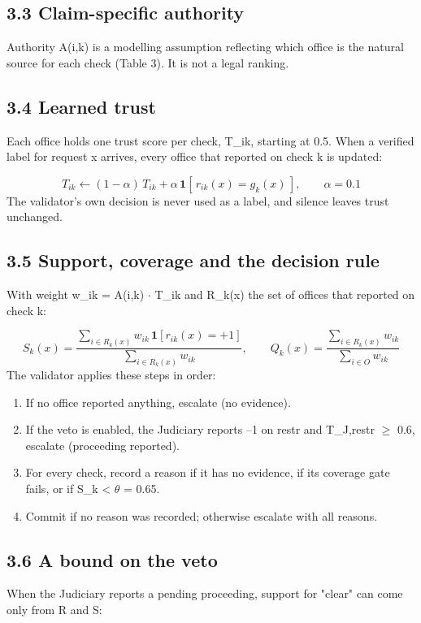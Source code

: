\documentclass[10pt]{article}
\begin{document}

\subsection*{3.3 Claim-specific authority}
Authority A(i,k) is a modelling assumption reflecting which office is the natural source for each check (Table 3). It is not a legal ranking.


\subsection*{3.4 Learned trust}
Each office holds one trust score per check, T\_ik, starting at 0.5. When a verified label for request x arrives, every office that reported on check k is updated:

\[ T_{ik} \leftarrow (1-\alpha)\,T_{ik} + \alpha\,\mathbf{1}[\,r_{ik}(x) = g_k(x)\,], \qquad \alpha = 0.1 \]
The validator's own decision is never used as a label, and silence leaves trust unchanged.

\subsection*{3.5 Support, coverage and the decision rule}
With weight w\_ik = A(i,k) $\cdot$ T\_ik and R\_k(x) the set of offices that reported on check k:

\[ S_k(x) = \frac{\sum_{i \in R_k(x)} w_{ik}\,\mathbf{1}[r_{ik}(x) = +1]}{\sum_{i \in R_k(x)} w_{ik}}, \qquad Q_k(x) = \frac{\sum_{i \in R_k(x)} w_{ik}}{\sum_{i \in O} w_{ik}} \]
The validator applies these steps in order:

\begin{enumerate}
\item If no office reported anything, escalate (no evidence).
\item If the veto is enabled, the Judiciary reports --1 on restr and T\_J,restr $\geq$ 0.6, escalate (proceeding reported).
\item For every check, record a reason if it has no evidence, if its coverage gate fails, or if S\_k < $\theta$ = 0.65.
\item Commit if no reason was recorded; otherwise escalate with all reasons.
\end{enumerate}
\subsection*{3.6 A bound on the veto}
When the Judiciary reports a pending proceeding, support for "clear" can come only from R and S:
\end{document}
